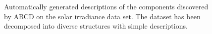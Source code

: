 \documentclass[letterpaper]{article}
\let\emptyset 0
\newcommand{\procedurename}{ABCD}
\begin{document}


\begin{figure}[h]
\centering
{}
\caption{
Automatically generated descriptions of the components discovered by \procedurename{} on the solar irradiance data set.
The dataset has been decomposed into diverse structures with simple descriptions.}
\label{fig:exec}
\end{figure}
\end{document}
